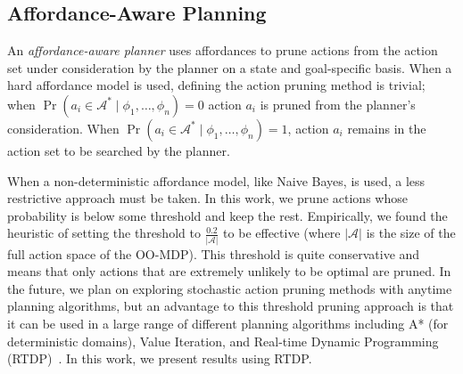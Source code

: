 \documentclass[letterpaper]{article}
\begin{document}

\subsection{Affordance-Aware Planning}
\label{sec:action_pruning}
An {\em affordance-aware planner} uses affordances 
to prune actions from the action set under consideration 
by the planner on a state and
goal-specific basis. When a hard affordance model is used, defining
the action pruning method is trivial; when
$\Pr(a_i \in \mathcal{A}^*  \mid \phi_1, \ldots, \phi_n) = 0$
action $a_i$ is pruned from the planner's consideration. When
$\Pr(a_i \in \mathcal{A}^*  \mid \phi_1, \ldots, \phi_n) = 1$,
action $a_i$ remains in the action set to be searched by the planner.

When a non-deterministic affordance model, like Naive Bayes, is used,
a less restrictive approach must be taken. In this work,
we prune actions whose probability is below some threshold and
keep the rest. Empirically, we found the heuristic
of setting the threshold to $\frac{0.2}{|\mathcal{A}|}$ to
be effective (where $|\mathcal{A}|$ is the size
of the full action space of the OO-MDP). This threshold is
quite conservative and means that only actions
that are extremely unlikely to be optimal are pruned. 
In the future, we plan on exploring
stochastic action pruning methods with anytime planning
algorithms, but an advantage to this threshold pruning
approach is that it can be used in a large range of different
planning algorithms including A* (for deterministic domains),
Value Iteration, and Real-time
Dynamic Programming (RTDP)~\cite{barto95}. In this work, we present results 
using RTDP.

\end{document}
